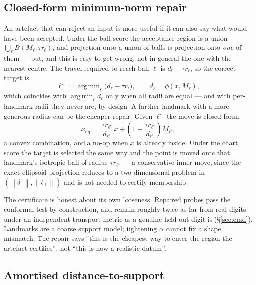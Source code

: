 \documentclass[12pt]{iopart}
\theoremstyle{definition}
\theoremstyle{plain}
\theoremstyle{remark}
\newcommand{\norm}[1]{\left\lVert#1\right\rVert}
\DeclareMathOperator*{\argmin}{arg\,min}
\begin{document}
\subsection{Closed-form minimum-norm repair}
\label{sec:repair}

An artefact that can reject an input is more useful if it can also say what
would have been accepted. Under the ball score the acceptance region is a union
$\bigcup_\ell B(M_\ell,\tau r_\ell)$, and projection onto a union of balls is
projection onto \emph{one} of them --- but, and this is easy to get wrong, not
in general the one with the nearest centre. The travel required to reach ball
$\ell$ is $d_\ell-\tau r_\ell$, so the correct target is
\begin{equation}
\label{eq:repairstar}
\ell^\star = \argmin_\ell\bigl(d_\ell-\tau r_\ell\bigr),
\qquad d_\ell=\phi(x,M_\ell),
\end{equation}
which coincides with $\argmin_\ell d_\ell$ only when all radii are equal ---
and with per-landmark radii they never are, by design. A farther landmark with
a more generous radius can be the cheaper repair. Given $\ell^\star$ the move is
closed form,
\begin{equation}
\label{eq:repair}
x_{\mathrm{rep}}
=
\frac{\tau r_{\ell^\star}}{d_{\ell^\star}}\,x
+
\left(1-\frac{\tau r_{\ell^\star}}{d_{\ell^\star}}\right)M_{\ell^\star},
\end{equation}
a convex combination, and a no-op when $x$ is already inside. Under the chart
score the target is selected the same way and the point is moved onto that
landmark's isotropic ball of radius $\tau r_{\ell^\star}$ --- a conservative
inner move, since the exact ellipsoid projection reduces to a two-dimensional
problem in $(\norm{\delta_\parallel},\norm{\delta_\perp})$ and is not needed to
certify membership.

The certificate is honest about its own looseness. Repaired probes pass the
conformal test by construction, and remain roughly twice as far from real
digits under an independent transport metric as a genuine held-out digit is
(\S\ref{sec:emd}). Landmarks are a coarse support model; tightening $\alpha$
cannot fix a shape mismatch. The repair says ``this is the cheapest way to
enter the region the artefact certifies'', not ``this is now a realistic
datum''.

\subsection{Amortised distance-to-support}
\label{sec:negspace}
\end{document}
